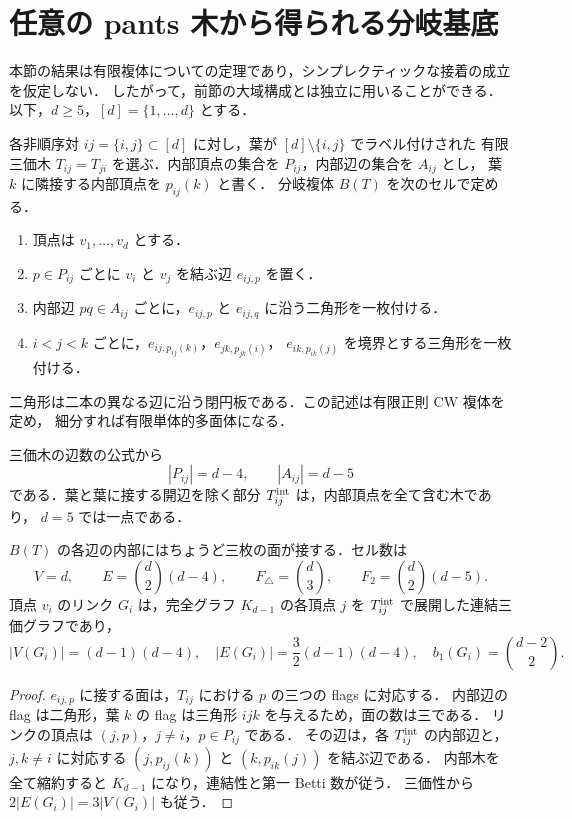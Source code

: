 \section{任意の pants 木から得られる分岐基底}\label{topo:section}

本節の結果は有限複体についての定理であり，シンプレクティックな接着の成立を仮定しない．
したがって，前節の大域構成とは独立に用いることができる．
以下，$d\geq5$，$[d]=\{1,\ldots,d\}$ とする．

\begin{definition}\label{topo:definition}
各非順序対 $ij=\{i,j\}\subset[d]$ に対し，葉が $[d]\setminus\{i,j\}$ でラベル付けされた
有限三価木 $T_{ij}=T_{ji}$ を選ぶ．内部頂点の集合を $P_{ij}$，内部辺の集合を $A_{ij}$ とし，
葉 $k$ に隣接する内部頂点を $p_{ij}(k)$ と書く．
分岐複体 $B(T)$ を次のセルで定める．
\begin{enumerate}
\item 頂点は $v_1,\ldots,v_d$ とする．
\item $p\in P_{ij}$ ごとに $v_i$ と $v_j$ を結ぶ辺 $e_{ij,p}$ を置く．
\item 内部辺 $pq\in A_{ij}$ ごとに，$e_{ij,p}$ と $e_{ij,q}$ に沿う二角形を一枚付ける．
\item $i<j<k$ ごとに，$e_{ij,p_{ij}(k)}$，$e_{jk,p_{jk}(i)}$，
$e_{ik,p_{ik}(j)}$ を境界とする三角形を一枚付ける．
\end{enumerate}
二角形は二本の異なる辺に沿う閉円板である．この記述は有限正則 CW 複体を定め，
細分すれば有限単体的多面体になる．
\end{definition}

三価木の辺数の公式から
\[
 |P_{ij}|=d-4,\qquad |A_{ij}|=d-5
\]
である．葉と葉に接する開辺を除く部分 $T_{ij}^{\rm int}$ は，内部頂点を全て含む木であり，
$d=5$ では一点である．

\begin{proposition}\label{topo:counts}
$B(T)$ の各辺の内部にはちょうど三枚の面が接する．セル数は
\[
 V=d,\qquad E=\binom d2(d-4),\qquad
 F_\triangle=\binom d3,\qquad F_2=\binom d2(d-5).
\]
頂点 $v_i$ のリンク $G_i$ は，完全グラフ $K_{d-1}$ の各頂点 $j$ を
$T_{ij}^{\rm int}$ で展開した連結三価グラフであり，
\[
 |V(G_i)|=(d-1)(d-4),\quad
 |E(G_i)|=\frac32(d-1)(d-4),\quad
 b_1(G_i)=\binom{d-2}{2}.
\]
\end{proposition}

\begin{proof}
$e_{ij,p}$ に接する面は，$T_{ij}$ における $p$ の三つの flags に対応する．
内部辺の flag は二角形，葉 $k$ の flag は三角形 $ijk$ を与えるため，面の数は三である．
リンクの頂点は $(j,p)$，$j\ne i$，$p\in P_{ij}$ である．
その辺は，各 $T_{ij}^{\rm int}$ の内部辺と，$j,k\ne i$ に対応する
$(j,p_{ij}(k))$ と $(k,p_{ik}(j))$ を結ぶ辺である．
内部木を全て縮約すると $K_{d-1}$ になり，連結性と第一 Betti 数が従う．
三価性から $2|E(G_i)|=3|V(G_i)|$ も従う．
\end{proof}

